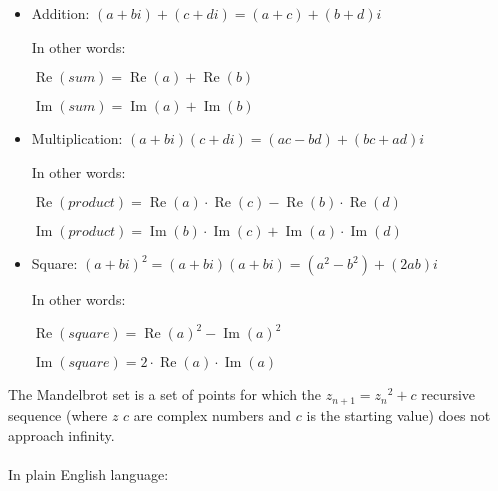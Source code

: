 \begin{itemize}
\item Addition: $(a+bi) + (c+di) = (a+c) + (b+d)i$

In other words:

$\operatorname{Re}(sum) = \operatorname{Re}(a) + \operatorname{Re}(b)$

$\operatorname{Im}(sum) = \operatorname{Im}(a) + \operatorname{Im}(b)$

\item Multiplication: $(a+bi) (c+di) = (ac-bd) + (bc+ad)i$

In other words:

$\operatorname{Re}(product) = \operatorname{Re}(a) \cdot \operatorname{Re}(c) - \operatorname{Re}(b) \cdot \operatorname{Re}(d)$

$\operatorname{Im}(product) = \operatorname{Im}(b) \cdot \operatorname{Im}(c) + \operatorname{Im}(a) \cdot \operatorname{Im}(d)$

\item Square: $(a+bi)^2 = (a+bi) (a+bi) = (a^2-b^2) + (2ab)i$

In other words:

$\operatorname{Re}(square) = \operatorname{Re}(a)^2-\operatorname{Im}(a)^2$

$\operatorname{Im}(square) = 2 \cdot \operatorname{Re}(a) \cdot \operatorname{Im}(a)$

\end{itemize}



The Mandelbrot set is a set of points for which the $z_{n+1} = {z_n}^2 + c$ recursive sequence
(where $z$ \AndENRU $c$ are complex numbers and $c$ 
is the starting value)
does not approach infinity.\\
\\
In plain English language: 

